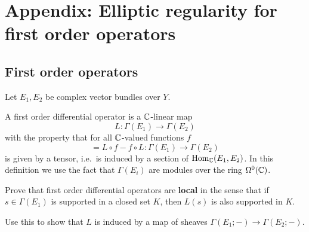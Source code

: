 \documentclass{amsart}
\begin{document}
\section*{\textbf{Appendix: Elliptic regularity for first order
    operators}}
\subsection*{First order operators}
\begin{defn}
  Let $E_{1},E_{2}$ be complex vector bundles over $Y$.
  
  A first order differential operator is a $\mathbb{C}$-linear map
  \begin{equation*}
    L:\Gamma(E_{1})\to \Gamma(E_{2})
  \end{equation*}
  with the property that for all $\mathbb{C}$-valued functions $f$
  \begin{equation*}
    [L,f]=L\circ f-f\circ L:\Gamma(E_{1})\to \Gamma(E_{2})
  \end{equation*}
  is given by a tensor, i.e.\ is induced by a section of $\operatorname{\mathrm{Hom}}_{\mathbb{C}}(E_{1},E_{2})$. In this definition we use the fact that $\Gamma(E_{i})$ are modules over the ring $\Omega^{0}(\mathbb{C})$.  
\end{defn}
\begin{xca}
  Prove that first order differential operators are \textbf{local} in the sense that if $s\in \Gamma(E_{1})$ is supported in a closed set $K$, then $L(s)$ is also supported in $K$.

  Use this to show that $L$ is induced by a map of sheaves $\Gamma(E_{1};-)\to \Gamma(E_{2};-)$.
\end{xca} 
\end{document}
